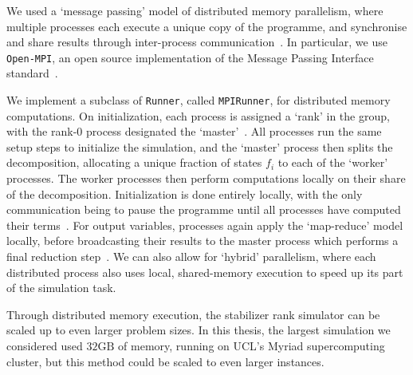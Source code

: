 We used a `message passing' model of distributed memory parallelism, where multiple processes each execute a unique copy of the programme, and synchronise and share results through inter-process communication~\cite{Kessler2007}. In particular, we use \texttt{Open-MPI}, an open source implementation of the Message Passing Interface standard~\cite{OpenMPI,MPIForum}.\par
We implement a subclass of \texttt{Runner}, called \texttt{MPIRunner}, for distributed memory computations. On initialization, each process is assigned a `rank' in the group, with the rank-0 process designated the `master'~\cite{MPIForum}. All processes run the same setup steps to initialize the simulation, and the `master' process then splits the decomposition, allocating a unique fraction of states $f_{i}$ to each of the `worker' processes. The worker processes then perform computations locally on their share of the decomposition. Initialization is done entirely locally, with the only communication being to pause the programme until all processes have computed their terms~\cite{MPIForum}. For output variables, processes again apply the `map-reduce' model locally, before broadcasting their results to the master process which performs a final reduction step~\cite{MPIForum}. We can also allow for `hybrid' parallelism, where each distributed process also uses local, shared-memory execution to speed up its part of the simulation task.\par
Through distributed memory execution, the stabilizer rank simulator can be scaled up to even larger problem sizes. In this thesis, the largest simulation we considered used $32\mathrm{GB}$ of memory, running on UCL's Myriad supercomputing cluster, but this method could be scaled to even larger instances.
